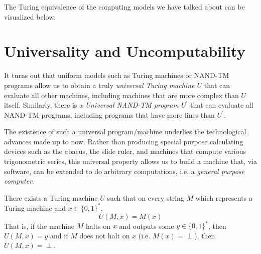 \documentclass{article}
\begin{document}
  The Turing equivalence of the computing models we have talked about can be visualized below: 
  \begin{center}
  \end{center}

\section{Universality and Uncomputability}

  It turns out that uniform models such as Turing machines or NAND-TM programs allow us to obtain a truly \textit{universal Turing machine $U$} that can evaluate all other machines, including machines that are more complex than $U$ itself. Similarly, there is a \textit{Universal NAND-TM program $U^\prime$} that can evaluate all NAND-TM programs, including programs that have more lines than $U^\prime$. 

  The existence of such a universal program/machine underlies the technological advances made up to now. Rather than producing special purpose calculating devices such as the abacus, the slide ruler, and machines that compute various trigonometric series, this universal property allows us to build a machine that, via software, can be extended to do arbitrary computations, i.e. a \textit{general purpose computer}. 



  \begin{theorem}
  There exists a Turing machine $U$ such that on every string $M$ which represents a Turing machine and $x \in \{0,1\}^*$, 
  \[U(M, x) = M(x)\]
  That is, if the machine $M$ halts on $x$ and outputs some $y \in \{0,1\}^*$, then $U(M, x) = y$ and if $M$ does not halt on $x$ (i.e. $M(x) = \perp$), then $U(M, x) = \perp$. 
  \end{theorem}
\end{document}
